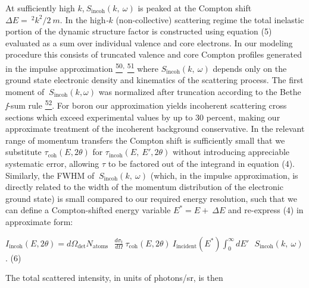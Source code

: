 At sufficiently high
\(k\),\(\ S_{\text{incoh}}\left( k,\ \omega \right)\) is peaked at the
Compton shift \(\Delta E = \ ^{2}k^{2}/2\ m\). In the high\emph{-}\(k\)
(non-collective) scattering regime the total inelastic portion of the
dynamic structure factor is constructed using equation (5) evaluated as
a sum over individual valence and core electrons. In our modeling
procedure this consists of truncated valence and core Compton profiles
generated in the impulse approximation
\hyperref[w.-schuelke-electron-dynamics-by-inelastic-x-ray-scattering-oxford-university-press-new-york-2007.]{\textsuperscript{50}}\textsuperscript{,}
\hyperref[p.-eisenberger-and-p.-m.-platzman-physical-review-a-2-415-1970.]{\textsuperscript{51}}
where \(S_{\text{incoh}}\left( k,\ \omega \right)\) depends only on the
ground state electronic density and kinematics of the scattering
process. The first moment of
\(\ S_{\text{incoh}}\left( k,\omega \right)\) was normalized after
truncation according to the Bethe \emph{f}-sum rule
\hyperref[b.-a.-mattern-g.-t.-seidler-j.-j.-kas-j.-i.-pacold-and-j.-j.-rehr-physical-review-b-85-115135-2012.]{\textsuperscript{52}}.
For boron our approximation yields incoherent scattering cross sections
which exceed experimental values by up to 30 percent, making our
approximate treatment of the incoherent background conservative. In the
relevant range of momentum transfers the Compton shift is sufficiently
small that we substitute \(\tau_{\text{coh}}\left( E,2\theta \right)\)
for \(\tau_{\text{incoh}}\left( E,\ E',2\theta \right)\) without
introducing appreciable systematic error, allowing \(\tau\) to be
factored out of the integrand in equation (4). Similarly, the FWHM of
\(\ S_{\text{incoh}}\left( k,\ \omega \right)\) (which, in the impulse
approximation, is directly related to the width of the momentum
distribution of the electronic ground state) is small compared to our
required energy resolution, such that we can define a Compton-shifted
energy variable \(E^{*} = E + \ \Delta E\) and re-express (4) in
approximate form:

\(I_{\text{incoh}}\left( E,2\theta \right) = d\Omega_{\det}N_{\text{atoms}}\text{\ \ }\frac{d\sigma_{t}}{d\Omega}\ \tau_{\text{coh}}\left( E,2\theta \right)\ I_{\text{incident}}\left( E^{*} \right)\int_{0}^{\infty}{dE'}\text{\ \ }S_{\text{incoh}}\left( k,\ \omega \right)\).
(6)

The total scattered intensity, in units of photons/sr, is then


